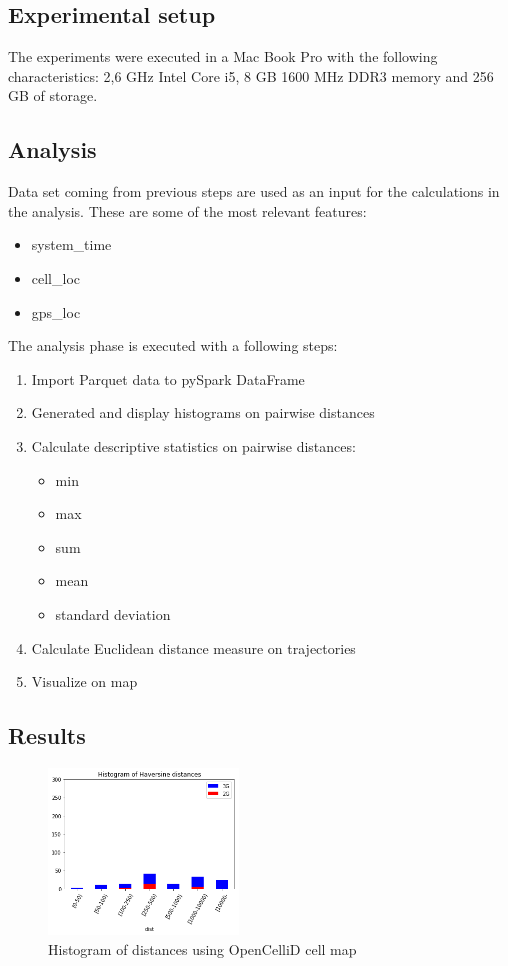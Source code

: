 \subsection{Experimental setup}
The experiments were executed in a Mac Book Pro with the following characteristics: 2,6 GHz Intel Core i5, 8 GB 1600 MHz DDR3 memory and 256 GB of storage.

\subsection{Analysis}
Data set coming from previous steps are used as an input for the calculations in the analysis. These are some of the most relevant features:
\begin{itemize}
    \item system\_time
    \item cell\_loc
    \item gps\_loc
\end{itemize}

The analysis phase is executed with a following steps:
\begin{enumerate}
    \item Import Parquet data to pySpark DataFrame
    \item Generated and display histograms on pairwise distances
    \item Calculate descriptive statistics on pairwise distances:
        \begin{itemize}
            \item min
            \item max
            \item sum
            \item mean
            \item standard deviation
        \end{itemize}
    \item Calculate Euclidean distance measure on trajectories
    \item Visualize on map
\end{enumerate}

\subsection{Results}
\begin{figure}[h!]
    \centering
    \includegraphics[width=0.45\textwidth]{images/hist_opencell.png}
    \caption{Histogram of distances using OpenCelliD cell map}
    \label{fig:hist_opencell}
\end{figure}

